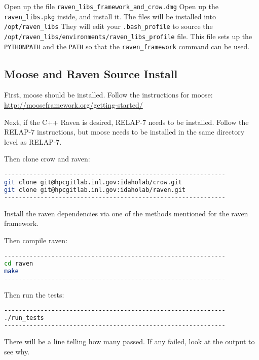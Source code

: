 Open up the file \verb'raven_libs_framework_and_crow.dmg' Open up the
\verb'raven_libs.pkg' inside, and install it.  The files will be
installed into \verb'/opt/raven_libs' They will edit your
\verb'.bash_profile' to source the
\verb'/opt/raven_libs/environments/raven_libs_profile' file.  This
file sets up the \verb'PYTHONPATH' and the \verb'PATH' so that the
\verb'raven_framework' command can be used.

\subsection{Moose and Raven Source Install}

First, moose should be installed.  Follow the instructions for moose:
\url{http://mooseframework.org/getting-started/}

Next, if the C++ Raven is desired, RELAP-7 needs to be installed.
Follow the RELAP-7 instructions, but moose needs to be installed
in the same directory level as RELAP-7.

Then clone crow and raven:

\begin{lstlisting}[language=bash]
-------------------------------------------------------------
git clone git@hpcgitlab.inl.gov:idaholab/crow.git
git clone git@hpcgitlab.inl.gov:idaholab/raven.git
-------------------------------------------------------------
\end{lstlisting}

Install the raven dependencies via one of the methods mentioned for
the raven framework.

Then compile raven:

\begin{lstlisting}[language=bash]
-------------------------------------------------------------
cd raven
make
-------------------------------------------------------------
\end{lstlisting}

Then run the tests:

\begin{lstlisting}[language=bash]
-------------------------------------------------------------
./run_tests
-------------------------------------------------------------
\end{lstlisting}

There will be a line telling how many passed.  If any failed, look at
the output to see why.
